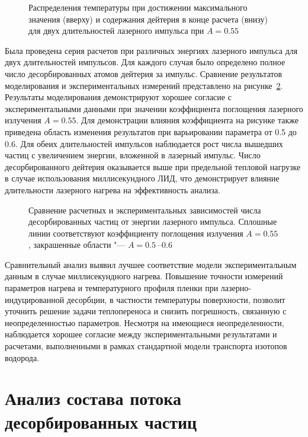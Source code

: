 \begin{figure}[ht]
    \caption{Распределения температуры при достижении максимального значения (вверху) и содержания дейтерия в конце расчета (внизу) для двух длительностей лазерного импульса при \( A = \num{0.55} \)}\label{fig:ch4/LID_2D}
\end{figure}

Была проведена серия расчетов при различных энергиях лазерного импульса для двух длительностей импульсов. Для каждого случая было определено полное число десорбированных атомов дейтерия за импульс. Сравнение результатов моделирования и экспериментальных измерений представлено на рисунке~\cref{fig:ch4/LID_Comparison}. Результаты моделирования демонстрируют хорошее согласие с экспериментальными данными при значении коэффициента поглощения лазерного излучения \(A=\num{0.55}\). Для демонстрации влияния коэффициента на рисунке также приведена область изменения результатов при варьировании параметра от \num{0.5} до \num{0.6}. Для обеих длительностей импульсов наблюдается рост числа вышедших частиц с увеличением энергии, вложенной в лазерный импульс. Число десорбированного дейтерия оказывается выше при предельной тепловой нагрузке в случае использования миллисекундного ЛИД, что демонстрирует влияние длительности лазерного нагрева на эффективность анализа.

\begin{figure}[ht]
    \caption{Сравнение расчетных и экспериментальных зависимостей числа десорбированных частиц от энергии лазерного импульса. Сплошные линии соответствуют коэффициенту поглощения излучения \( A=\num{0.55} \), закрашенные области "--- \( A = \SIrange{0.5}{0.6}{} \)}\label{fig:ch4/LID_Comparison}
\end{figure}

Сравнительный анализ выявил лучшее соответствие модели экспериментальным данным в случае миллисекундного нагрева. Повышение точности измерений параметров нагрева и температурного профиля пленки при лазерно-индуцированной десорбции, в частности температуры поверхности, позволит уточнить решение задачи теплопереноса и снизить погрешность, связанную с неопределенностью параметров. Несмотря на имеющиеся неопределенности, наблюдается хорошее согласие между экспериментальными результатами и расчетами, выполненными в рамках стандартной модели транспорта изотопов водорода.

\section{Анализ состава потока десорбированных частиц}\label{sec:ch4/seс2}

